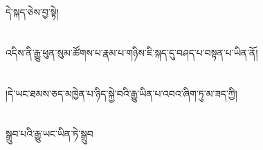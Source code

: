 དེ་སྐད་ཅེས་བྱ་སྟེ།\chapter{ }འདིས་ནི་རྒྱུ་ཕུན་སུམ་ཚོགས་པ་རྣམ་པ་གཉིས་ཇི་སྐད་དུ་བཤད་པ་བསྟན་པ་ཡིན་ནོ།\chapter{ }།དེ་ཡང་ཐམས་ཅད་མཁྱེན་པ་ཉིད་སྐྱེ་བའི་རྒྱུ་ཡིན་པ་འབའ་ཞིག་ཏུ་མ་ཟད་ཀྱི།\chapter{ }སྒྲུབ་པའི་རྒྱུ་ཡང་ཡིན་ཏེ་སྒྲུབ